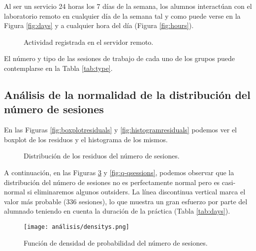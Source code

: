 Al ser un servicio 24 horas los 7 días de la semana, los alumnos interactúan con el laboratorio remoto en cualquier día de la semana tal y como puede verse en la Figura \ref{fig:days} y a cualquier hora del día (Figura \ref{fig:hours}).

\begin{figure}[H]
\centering
{}\qquad
{}
\caption{Actividad registrada en el servidor remoto.}
\label{fig:activity}
\end{figure}

El número y tipo de las sesiones de trabajo de cada uno de los grupos puede contemplarse en la Tabla \ref{tab:type}.

\subsection{Análisis de la normalidad de la distribución del número de sesiones}\label{sec:NormalityNumSessions}

En las Figuras \ref{fig:boxplotresiduals} y \ref{fig:histogramresiduals} podemos ver el boxplot de los residuos y el histograma de los mismos.

\begin{figure}[H]
\centering
{}\qquad
{}
\caption{Distribución de los residuos del número de sesiones.}
\label{fig:activity}
\end{figure}

A continuación, en las Figuras \ref{fig:densitysessions} y \ref{fig:q-qsessions}, podemos observar que la distribución del número de sesiones no es perfectamente normal pero es casi-normal si eliminaremos algunos outsiders. La línea discontinua vertical marca el valor más probable ($336$ sesiones), lo que muestra un gran esfuerzo por parte del alumnado teniendo en cuenta la duración de la práctica (Tabla \ref{tab:days}).

\begin{figure}[H]
    \centering
    \texttt{[image: análisis/densitys.png]}
    \caption{Función de densidad de probabilidad del número de sesiones.}
    \label{fig:densitysessions}
\end{figure}


